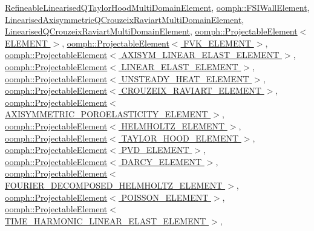 \hyperlink{classRefineableLinearisedQTaylorHoodMultiDomainElement_ae9582bd850c53a41150ffd4c67dd0f00}{Refineable\+Linearised\+Q\+Taylor\+Hood\+Multi\+Domain\+Element}, \hyperlink{classoomph_1_1FSIWallElement_a7817d2662c24540d3757cb1a1194a635}{oomph\+::\+F\+S\+I\+Wall\+Element}, \hyperlink{classLinearisedAxisymmetricQCrouzeixRaviartMultiDomainElement_a3920198ff369a194c7d0ca4628af1a8c}{Linearised\+Axisymmetric\+Q\+Crouzeix\+Raviart\+Multi\+Domain\+Element}, \hyperlink{classLinearisedQCrouzeixRaviartMultiDomainElement_a7798d37a41ab3e965da4142b1731a9e4}{Linearised\+Q\+Crouzeix\+Raviart\+Multi\+Domain\+Element}, \hyperlink{classoomph_1_1ProjectableElement_a5b6894eda403bd2b9d2cf1e0314d7a23}{oomph\+::\+Projectable\+Element$<$ E\+L\+E\+M\+E\+N\+T $>$}, \hyperlink{classoomph_1_1ProjectableElement_a5b6894eda403bd2b9d2cf1e0314d7a23}{oomph\+::\+Projectable\+Element$<$ F\+V\+K\+\_\+\+E\+L\+E\+M\+E\+N\+T $>$}, \hyperlink{classoomph_1_1ProjectableElement_a5b6894eda403bd2b9d2cf1e0314d7a23}{oomph\+::\+Projectable\+Element$<$ A\+X\+I\+S\+Y\+M\+\_\+\+L\+I\+N\+E\+A\+R\+\_\+\+E\+L\+A\+S\+T\+\_\+\+E\+L\+E\+M\+E\+N\+T $>$}, \hyperlink{classoomph_1_1ProjectableElement_a5b6894eda403bd2b9d2cf1e0314d7a23}{oomph\+::\+Projectable\+Element$<$ L\+I\+N\+E\+A\+R\+\_\+\+E\+L\+A\+S\+T\+\_\+\+E\+L\+E\+M\+E\+N\+T $>$}, \hyperlink{classoomph_1_1ProjectableElement_a5b6894eda403bd2b9d2cf1e0314d7a23}{oomph\+::\+Projectable\+Element$<$ U\+N\+S\+T\+E\+A\+D\+Y\+\_\+\+H\+E\+A\+T\+\_\+\+E\+L\+E\+M\+E\+N\+T $>$}, \hyperlink{classoomph_1_1ProjectableElement_a5b6894eda403bd2b9d2cf1e0314d7a23}{oomph\+::\+Projectable\+Element$<$ C\+R\+O\+U\+Z\+E\+I\+X\+\_\+\+R\+A\+V\+I\+A\+R\+T\+\_\+\+E\+L\+E\+M\+E\+N\+T $>$}, \hyperlink{classoomph_1_1ProjectableElement_a5b6894eda403bd2b9d2cf1e0314d7a23}{oomph\+::\+Projectable\+Element$<$ A\+X\+I\+S\+Y\+M\+M\+E\+T\+R\+I\+C\+\_\+\+P\+O\+R\+O\+E\+L\+A\+S\+T\+I\+C\+I\+T\+Y\+\_\+\+E\+L\+E\+M\+E\+N\+T $>$}, \hyperlink{classoomph_1_1ProjectableElement_a5b6894eda403bd2b9d2cf1e0314d7a23}{oomph\+::\+Projectable\+Element$<$ H\+E\+L\+M\+H\+O\+L\+T\+Z\+\_\+\+E\+L\+E\+M\+E\+N\+T $>$}, \hyperlink{classoomph_1_1ProjectableElement_a5b6894eda403bd2b9d2cf1e0314d7a23}{oomph\+::\+Projectable\+Element$<$ T\+A\+Y\+L\+O\+R\+\_\+\+H\+O\+O\+D\+\_\+\+E\+L\+E\+M\+E\+N\+T $>$}, \hyperlink{classoomph_1_1ProjectableElement_a5b6894eda403bd2b9d2cf1e0314d7a23}{oomph\+::\+Projectable\+Element$<$ P\+V\+D\+\_\+\+E\+L\+E\+M\+E\+N\+T $>$}, \hyperlink{classoomph_1_1ProjectableElement_a5b6894eda403bd2b9d2cf1e0314d7a23}{oomph\+::\+Projectable\+Element$<$ D\+A\+R\+C\+Y\+\_\+\+E\+L\+E\+M\+E\+N\+T $>$}, \hyperlink{classoomph_1_1ProjectableElement_a5b6894eda403bd2b9d2cf1e0314d7a23}{oomph\+::\+Projectable\+Element$<$ F\+O\+U\+R\+I\+E\+R\+\_\+\+D\+E\+C\+O\+M\+P\+O\+S\+E\+D\+\_\+\+H\+E\+L\+M\+H\+O\+L\+T\+Z\+\_\+\+E\+L\+E\+M\+E\+N\+T $>$}, \hyperlink{classoomph_1_1ProjectableElement_a5b6894eda403bd2b9d2cf1e0314d7a23}{oomph\+::\+Projectable\+Element$<$ P\+O\+I\+S\+S\+O\+N\+\_\+\+E\+L\+E\+M\+E\+N\+T $>$}, \hyperlink{classoomph_1_1ProjectableElement_a5b6894eda403bd2b9d2cf1e0314d7a23}{oomph\+::\+Projectable\+Element$<$ T\+I\+M\+E\+\_\+\+H\+A\+R\+M\+O\+N\+I\+C\+\_\+\+L\+I\+N\+E\+A\+R\+\_\+\+E\+L\+A\+S\+T\+\_\+\+E\+L\+E\+M\+E\+N\+T $>$}, 